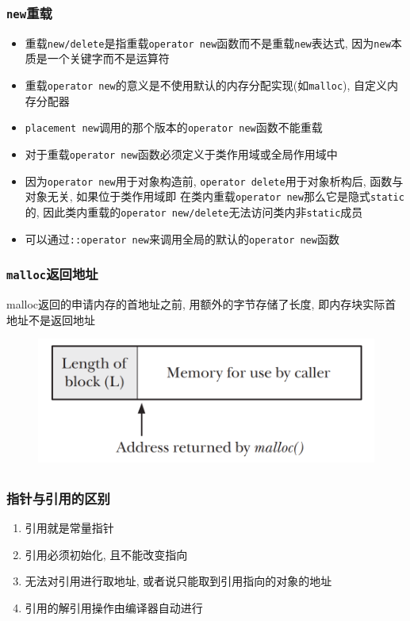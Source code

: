 \subsubsection{{\tt new}重载}

\begin{itemize}
	\item 重载{\tt new/delete}是指重载{\tt operator new}函数而不是重载{\tt new}表达式, 因为{\tt new}本质是一个关键字而不是运算符
	\item 重载{\tt operator new}的意义是不使用默认的内存分配实现(如{\tt malloc}), 自定义内存分配器
	\item {\tt placement new}调用的那个版本的{\tt operator new}函数不能重载
	\item 对于重载{\tt operator new}函数必须定义于类作用域或全局作用域中
	\item 因为{\tt operator new}用于对象构造前, 
			{\tt operator delete}用于对象析构后, 函数与对象无关, 如果位于类作用域即
			在类内重载{\tt operator new}那么它是隐式{\tt static}的, 
			因此类内重载的{\tt operator new/delete}无法访问类内非{\tt static}成员
	\item 可以通过{\tt::operator new}来调用全局的默认的{\tt operator new}函数
\end{itemize}
\subsubsection{{\tt malloc}返回地址}
malloc返回的申请内存的首地址之前, 用额外的字节存储了长度, 即内存块实际首地址不是返回地址
\begin{figure}[htbp]
	\centering
	\includegraphics[scale=0.25]{tex_include/pic_include/cpp_basic_malloc.png}
\end{figure}
\subsection{\color{purple}{指针与引用}}
\subsubsection{指针与引用的区别}
\begin{enumerate}
	\item 引用就是常量指针
	\item 引用必须初始化, 且不能改变指向
	\item 无法对引用进行取地址, 或者说只能取到引用指向的对象的地址
	\item 引用的解引用操作由编译器自动进行
\end{enumerate}
